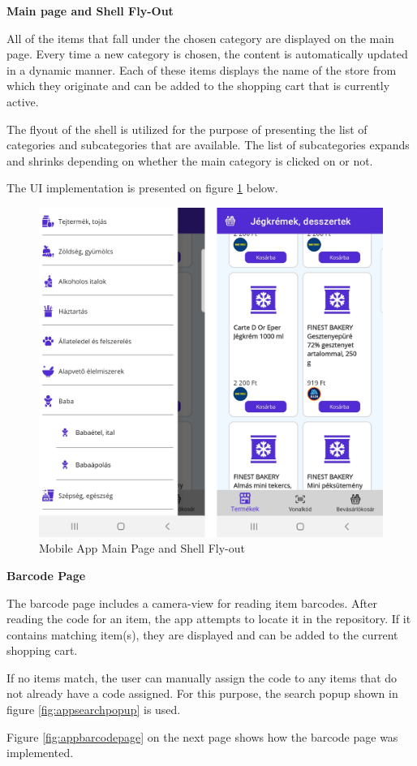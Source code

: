 \noindent\textbf{Main page and Shell Fly-Out}

All of the items that fall under the chosen category are displayed on the main page. Every time a new category is chosen, the content is automatically updated in a dynamic manner. Each of these items displays the name of the store from which they originate and can be added to the shopping cart that is currently active. 

The flyout of the shell is utilized for the purpose of presenting the list of categories and subcategories that are available. The list of subcategories expands and shrinks depending on whether the main category is clicked on or not. 

The UI implementation is presented on figure \ref{fig:appitemspage} below.

\begin{figure}[H]
	\centering
	\includegraphics[width=0.5\linewidth]{img/app_itemspage.png}
	\caption{Mobile App Main Page and Shell Fly-out}
	\label{fig:appitemspage}
\end{figure}

\noindent\textbf{Barcode Page}

The barcode page includes a camera-view for reading item barcodes. After reading the code for an item, the app attempts to locate it in the repository. If it contains matching item(s), they are displayed and can be added to the current shopping cart. 

If no items match, the user can manually assign the code to any items that do not already have a code assigned. For this purpose, the search popup shown in figure \ref{fig:appsearchpopup} is used.

Figure \ref{fig:appbarcodepage} on the next page shows how the barcode page was implemented.

